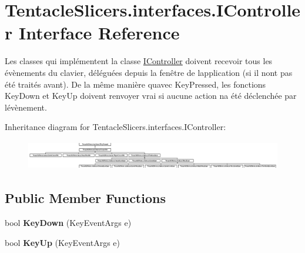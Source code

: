 \hypertarget{interface_tentacle_slicers_1_1interfaces_1_1_i_controller}{}\section{Tentacle\+Slicers.\+interfaces.\+I\+Controller Interface Reference}
\label{interface_tentacle_slicers_1_1interfaces_1_1_i_controller}


Les classes qui implémentent la classe \hyperlink{interface_tentacle_slicers_1_1interfaces_1_1_i_controller}{I\+Controller} doivent recevoir tous les évènements du clavier, déléguées depuis la fenêtre de l\textquotesingle{}application (si il n\textquotesingle{}ont pas été traités avant). De la même manière qu\textquotesingle{}avec Key\+Pressed, les fonctions Key\+Down et Key\+Up doivent renvoyer vrai si aucune action n\textquotesingle{}a été déclenchée par l\textquotesingle{}évènement.  


Inheritance diagram for Tentacle\+Slicers.\+interfaces.\+I\+Controller\+:\begin{figure}[H]
\begin{center}
\leavevmode
\includegraphics[height=1.282051cm]{interface_tentacle_slicers_1_1interfaces_1_1_i_controller}
\end{center}
\end{figure}
\subsection*{Public Member Functions}
\begin{DoxyCompactItemize}
\item 
\mbox{\label{interface_tentacle_slicers_1_1interfaces_1_1_i_controller_a8e273c3dbf68c06ecf64acfd8d9b6632}} 
bool {\bfseries Key\+Down} (Key\+Event\+Args e)
\item 
\mbox{\label{interface_tentacle_slicers_1_1interfaces_1_1_i_controller_a05874460c4ed12954b5e978fab0c13b3}} 
bool {\bfseries Key\+Up} (Key\+Event\+Args e)
\end{DoxyCompactItemize}


